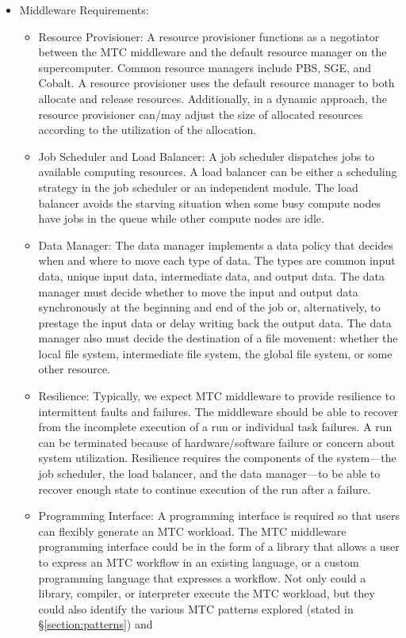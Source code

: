 \documentclass[10pt,letterpaper]{article}
\begin{document}
\begin{itemize}
\begin{itemize}
      \end{itemize}
    \item Middleware Requirements:
      \begin{itemize}
        \item Resource Provisioner:
	  A resource provisioner functions as a negotiator between the MTC middleware and the default resource manager on the supercomputer. Common resource managers include PBS, SGE, and Cobalt. A resource provisioner uses the default resource manager to both allocate and release resources. Additionally, in a dynamic approach, the resource provisioner can/may adjust the size of allocated resources according to the utilization of the allocation.
	\item Job Scheduler and Load Balancer:
	  A job scheduler dispatches jobs to available computing resources. A load balancer can be either a scheduling strategy in the job scheduler or an independent module. The load balancer avoids the starving situation when some busy compute nodes have jobs in the queue while other compute nodes are idle.
	\item Data Manager:
	  The data manager implements a data policy that decides when and where to move each type of data. The types are common input data, unique input data, intermediate data, and output data. The data manager must decide
        whether to move the input and output data synchronously at the beginning
        and end of the job or, alternatively, to prestage the input data or delay writing
        back the output data.
        The data manager also must decide the destination of a file movement: whether the local file system, intermediate file system, the global file system, or some other resource.
	\item Resilience:
	  Typically, we expect MTC middleware to provide resilience to
          intermittent faults and failures.  The middleware should be able
          to recover from the incomplete execution of a run or individual task
          failures. A run can be terminated because of hardware/software failure or concern about system utilization. Resilience requires the components of the
          system---the job scheduler, the load balancer, and the data manager---to be
           able to recover enough state to continue execution
           of the run after a failure.
	\item Programming Interface:
	  A programming interface is required so that users can flexibly generate an MTC workload. The MTC middleware programming interface could be in the form of a library that allows a user to express an MTC workflow in an existing language, or a custom programming language that expresses a workflow. Not only could a library, compiler, or interpreter execute the MTC workload, but they could also identify the various MTC patterns explored (stated in \S\ref{section:patterns}) and

\end{itemize}
\end{itemize}
\end{document}
